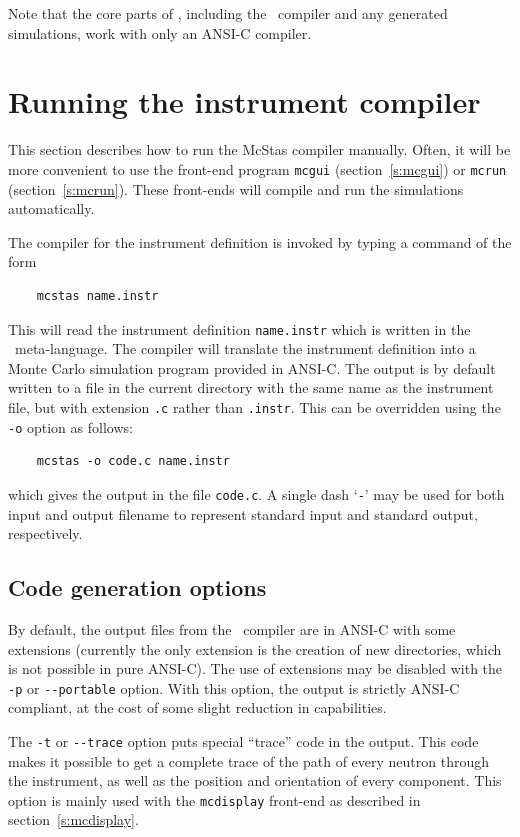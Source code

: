 Note that the core parts of \MCS, including the \MCS\ compiler and any
generated simulations, work with only
an ANSI-C compiler.


\section{Running the instrument compiler}
\label{s:running}

This section describes how to run the McStas compiler manually. Often,
it will be more convenient to use the front-end program \verb+mcgui+
(section~\ref{s:mcgui}) or \verb+mcrun+ (section~\ref{s:mcrun}). These
front-ends will compile and run the simulations automatically.

The compiler for the \MCS{} instrument definition 
is invoked by typing a command of the form
\begin{verbatim}
    mcstas name.instr
\end{verbatim}
This will read the instrument definition \verb+name.instr+ which is
written in the \MCS\ meta-language. The compiler will translate the
instrument definition into a Monte Carlo simulation program provided in
ANSI-C. The output is by default written to a file in the current
directory with the same name as the instrument file, but with extension
\verb+.c+ rather than \verb+.instr+. This can be overridden using the
\verb+-o+ option as follows:
\begin{verbatim}
    mcstas -o code.c name.instr
\end{verbatim}
which gives the output in the file \verb+code.c+.
A single dash `\verb+-+' may be used for both input and output filename
to represent standard input and standard output, respectively.


\subsection{Code generation options}

By default, the output files from the \MCS\ compiler are in ANSI-C with
some extensions (currently the only extension is the creation of new
directories, which is not possible in pure ANSI-C). The use of
extensions may be disabled with the \verb+-p+ or \verb+--portable+
option. With this option, the output is strictly ANSI-C compliant, at
the cost of some slight reduction in capabilities.

The \verb+-t+ or \verb+--trace+ option puts special ``trace'' code in
the output. This code makes it possible to get a complete trace of the
path of every neutron through the instrument, as well as the position
and orientation of every component. This option is mainly used with the
\verb+mcdisplay+ front-end as described in section~\ref{s:mcdisplay}.

